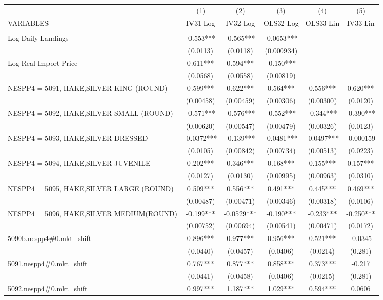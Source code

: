 \begin{tabular}{lccccc} \hline
 & (1) & (2) & (3) & (4) & (5) \\
VARIABLES & IV31 Log & IV32 Log & OLS32 Log & OLS33 Lin & IV33 Lin \\ \hline
 &  &  &  &  &  \\
Log Daily Landings & -0.553*** & -0.565*** & -0.0653*** &  &  \\
 & (0.0113) & (0.0118) & (0.000934) &  &  \\
Log Real Import Price & 0.611*** & 0.594*** & -0.150*** &  &  \\
 & (0.0568) & (0.0558) & (0.00819) &  &  \\
NESPP4 = 5091, HAKE,SILVER KING (ROUND) & 0.599*** & 0.622*** & 0.564*** & 0.556*** & 0.620*** \\
 & (0.00458) & (0.00459) & (0.00306) & (0.00300) & (0.0120) \\
NESPP4 = 5092, HAKE,SILVER SMALL (ROUND) & -0.571*** & -0.576*** & -0.552*** & -0.344*** & -0.390*** \\
 & (0.00620) & (0.00547) & (0.00479) & (0.00326) & (0.0123) \\
NESPP4 = 5093, HAKE,SILVER DRESSED & -0.0372*** & -0.139*** & -0.0481*** & -0.0497*** & -0.000159 \\
 & (0.0105) & (0.00842) & (0.00734) & (0.00513) & (0.0223) \\
NESPP4 = 5094, HAKE,SILVER JUVENILE & 0.202*** & 0.346*** & 0.168*** & 0.155*** & 0.157*** \\
 & (0.0127) & (0.0130) & (0.00995) & (0.00963) & (0.0310) \\
NESPP4 = 5095, HAKE,SILVER LARGE (ROUND) & 0.509*** & 0.556*** & 0.491*** & 0.445*** & 0.469*** \\
 & (0.00487) & (0.00471) & (0.00346) & (0.00318) & (0.0106) \\
NESPP4 = 5096, HAKE,SILVER MEDIUM(ROUND) & -0.199*** & -0.0529*** & -0.190*** & -0.233*** & -0.250*** \\
 & (0.00752) & (0.00694) & (0.00541) & (0.00471) & (0.0172) \\
5090b.nespp4\#0.mkt\_shift & 0.896*** & 0.977*** & 0.956*** & 0.521*** & -0.0345 \\
 & (0.0440) & (0.0457) & (0.0406) & (0.0214) & (0.281) \\
5091.nespp4\#0.mkt\_shift & 0.767*** & 0.877*** & 0.858*** & 0.373*** & -0.217 \\
 & (0.0441) & (0.0458) & (0.0406) & (0.0215) & (0.281) \\
5092.nespp4\#0.mkt\_shift & 0.997*** & 1.187*** & 1.029*** & 0.594*** & 0.0606 \\

\end{tabular}
